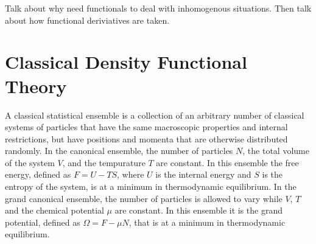 
Talk about why need functionals to deal with inhomogenous situations.
Then talk about how functional deriviatives are taken.

\section{Classical Density Functional Theory}

A classical statistical ensemble is a collection of an arbitrary
number of classical systems of particles that have the same
macroscopic properties and internal restrictions, but have positions
and momenta that are otherwise distributed randomly.  In the canonical
ensemble, the number of particles $N$, the total volume of the system
$V$, and the tempurature $T$ are constant.  In this ensemble the free
energy, defined as $F = U - TS$, where $U$ is the internal energy and
$S$ is the entropy of the system, is at a minimum in thermodynamic
equilibrium. In the grand canonical ensemble, the number of particles
is allowed to vary while $V$, $T$ and the chemical potential $\mu$ are
constant.  In this ensemble it is the grand potential, defined as
$\Omega = F - \mu N$, that is at a minimum in thermodynamic
equilibrium.

